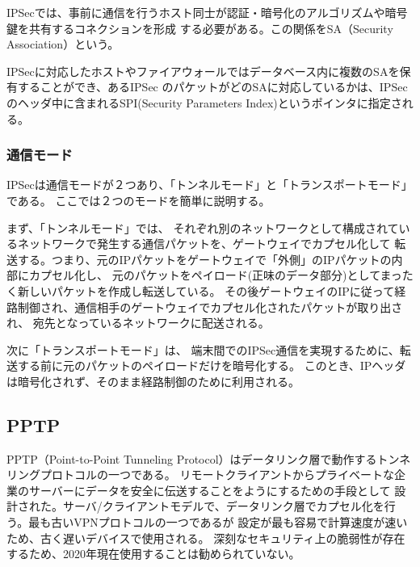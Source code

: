 \documentclass[12pt,a4paper,titlepage]{jreport}
\begin{document}
IPSecでは、事前に通信を行うホスト同士が認証・暗号化のアルゴリズムや暗号鍵を共有するコネクションを形成
する必要がある。この関係をSA（Security Association）という。\par
IPSecに対応したホストやファイアウォールではデータベース内に複数のSAを保有することができ、あるIPSec
のパケットがどのSAに対応しているかは、IPSecのヘッダ中に含まれるSPI(Security Parameters Index)というポインタに指定される。
\par 
\subsubsection*{通信モード}
IPSecは通信モードが２つあり、「トンネルモード」と「トランスポートモード」である。
ここでは２つのモードを簡単に説明する。

まず、「トンネルモード」では、
    それぞれ別のネットワークとして構成されているネットワークで発生する通信パケットを、ゲートウェイでカプセル化して
    転送する。つまり、元のIPパケットをゲートウェイで「外側」のIPパケットの内部にカプセル化し、
    元のパケットをペイロード(正味のデータ部分)としてまったく新しいパケットを作成し転送している。
    その後ゲートウェイのIPに従って経路制御され、通信相手のゲートウェイでカプセル化されたパケットが取り出され、
    宛先となっているネットワークに配送される。

次に「トランスポートモード」は、
端末間でのIPSec通信を実現するために、転送する前に元のパケットのペイロードだけを暗号化する。
このとき、IPヘッダは暗号化されず、そのまま経路制御のために利用される。


\subsection{PPTP}
PPTP（Point-to-Point Tunneling Protocol）\cite{RFC2637}はデータリンク層で動作するトンネリングプロトコルの一つである。
リモートクライアントからプライベートな企業のサーバーにデータを安全に伝送することをようにするための手段として
設計された。サーバ/クライアントモデルで、データリンク層でカプセル化を行う。最も古いVPNプロトコルの一つであるが
設定が最も容易で計算速度が速いため、古く遅いデバイスで使用される。
深刻なセキュリティ上の脆弱性が存在するため、2020年現在使用することは勧められていない。
\end{document}
